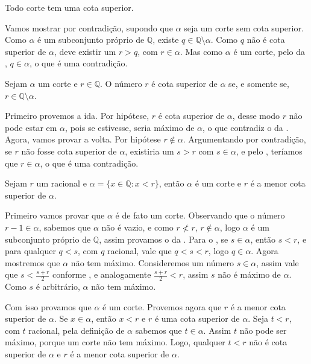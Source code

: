 \documentclass[../main.tex]{subfiles}
\begin{document}
\begin{teo}\label{reais-teo-todoCorteTemCotaSuperior}
    Todo corte tem uma cota superior.
\end{teo}
\begin{dem}
    Vamos mostrar por contradição, supondo que $\alpha$ seja um corte sem cota superior.
    Como $\alpha$ é um subconjunto próprio de $\mathbb{Q}$, existe $q \in \mathbb{Q} \setminus \alpha$. Como $q$ não é cota superior de $\alpha$, deve existir um $r > q$, com $r \in \alpha$. Mas como $\alpha$ é um corte, pelo  da , $q \in \alpha$, o que é uma contradição.
\end{dem}

\begin{prop}
    Sejam $\alpha$ um corte e $r \in \mathbb{Q}$. O número $r$ é cota superior de $\alpha$ se, e somente se, $r \in \mathbb{Q} \setminus \alpha$. 
\end{prop}
\begin{dem}
    Primeiro provemos a ida. Por hipótese, $r$ é cota superior de $\alpha$, desse modo $r$ não pode estar em $\alpha$, pois se estivesse, seria máximo de $\alpha$, o que contradiz o  da .
    Agora, vamos provar a volta. Por hipótese $r \not\in \alpha$. Argumentando por contradição, se $r$ não fosse cota superior de $\alpha$, existiria um $s > r$ com $s \in \alpha$, e pelo , teríamos que $r \in \alpha$, o que é uma contradição.
\end{dem}
\begin{teo}\label{reais-teo-corteRacional}
    Sejam $r$ um racional e $\alpha = \{ x \in \mathbb{Q} : x < r \}$, então $\alpha$ é um corte e $r$ é a menor cota superior de $\alpha$.
\end{teo}
\begin{dem}
    
    Primeiro vamos provar que $\alpha$ é de fato um corte. Observando que o número $r - 1 \in \alpha$, sabemos que $\alpha$ não é vazio, e como $r \not< r$, $r \not\in \alpha$, logo $\alpha$ é um subconjunto próprio de $\mathbb{Q}$, assim provamos o  da .
    Para o , se $s \in \alpha$, então $s < r$, e para qualquer $q < s$, com $q$ racional, vale que $q < s < r$, logo $q \in \alpha$.
    Agora mostremos que $\alpha$ não tem máximo. Consideremos um número $s \in \alpha$, assim vale que $s < \frac{s+r}{2}$ conforme , e analogamente $\frac{s+r}{2} < r$, assim $s$ não é máximo de $\alpha$. Como $s$ é arbitrário, $\alpha$ não tem máximo.

    Com isso provamos que $\alpha$ é um corte. Provemos agora que $r$ é a menor cota superior de $\alpha$. Se $x \in \alpha$, então $x < r$ e $r$ é uma cota superior de $\alpha$. Seja $t < r$, com $t$ racional, pela definição de $\alpha$ sabemos que $t \in \alpha$. Assim $t$ não pode ser máximo, porque um corte não tem máximo. Logo, qualquer $t < r$ não é cota superior de $\alpha$ e $r$ é a menor cota superior de $\alpha$.
\end{dem}
\end{document}
